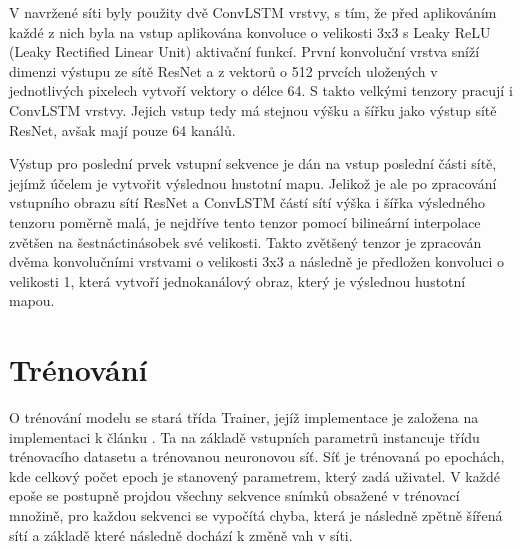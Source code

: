 V navržené síti byly použity dvě ConvLSTM vrstvy, s tím, že před aplikováním každé z nich byla na vstup aplikována konvoluce o velikosti 3x3 s Leaky ReLU (Leaky Rectified Linear Unit) \cite{LeakyReLU} aktivační funkcí.
První konvoluční vrstva sníží dimenzi výstupu ze sítě ResNet a z vektorů o 512 prvcích uložených v jednotlivých pixelech vytvoří vektory o délce 64. 
S takto velkými tenzory pracují i ConvLSTM vrstvy.
Jejich vstup tedy má stejnou výšku a šířku jako výstup sítě ResNet, avšak mají pouze 64 kanálů.

Výstup pro poslední prvek vstupní sekvence je dán na vstup poslední části sítě, jejímž účelem je vytvořit výslednou hustotní mapu.
Jelikož je ale po zpracování vstupního obrazu sítí ResNet a ConvLSTM částí sítí výška i šířka výsledného tenzoru poměrně malá, je nejdříve tento tenzor pomocí bilineární interpolace zvětšen na šestnáctinásobek své velikosti.
Takto zvětšený tenzor je zpracován dvěma konvolučními vrstvami o velikosti 3x3 a následně je předložen konvoluci o velikosti 1, která vytvoří jednokanálový obraz, který je výslednou hustotní mapou.

\section{Trénování}
O trénování modelu se stará třída Trainer, jejíž implementace je založena na implementaci k článku \cite{DM_Count}.
Ta na základě vstupních parametrů instancuje třídu trénovacího datasetu a trénovanou neuronovou síť.
Síť je trénovaná po epochách, kde celkový počet epoch je stanovený parametrem, který zadá uživatel.
V každé epoše se postupně projdou všechny sekvence snímků obsažené v trénovací množině, pro každou sekvenci se vypočítá chyba, která je následně zpětně šířená sítí a základě které následně dochází k změně vah v síti.

\endinput